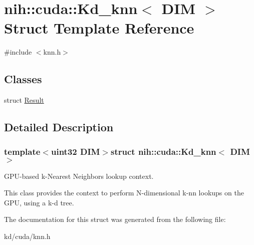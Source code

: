 \hypertarget{structnih_1_1cuda_1_1_kd__knn}{
\section{nih\-:\-:cuda\-:\-:\-Kd\-\_\-knn$<$ \-D\-I\-M $>$ \-Struct \-Template \-Reference}
\label{structnih_1_1cuda_1_1_kd__knn}
}


{\ttfamily \#include $<$knn.\-h$>$}

\subsection*{\-Classes}
\begin{DoxyCompactItemize}
\item 
struct \hyperlink{structnih_1_1cuda_1_1_kd__knn_1_1_result}{\-Result}
\end{DoxyCompactItemize}


\subsection{\-Detailed \-Description}
\subsubsection*{template$<$uint32 \-D\-I\-M$>$struct nih\-::cuda\-::\-Kd\-\_\-knn$<$ D\-I\-M $>$}

\-G\-P\-U-\/based k-\/\-Nearest \-Neighbors lookup context.

\-This class provides the context to perform \-N-\/dimensional k-\/nn lookups on the \-G\-P\-U, using a k-\/d tree. 

\-The documentation for this struct was generated from the following file\-:\begin{DoxyCompactItemize}
\item 
kd/cuda/knn.\-h\end{DoxyCompactItemize}
